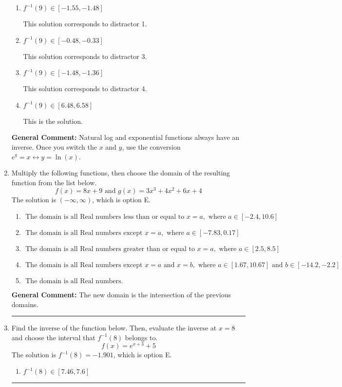 \documentclass{extbook}[14pt]
\newcommand{\litem}[1]{\item #1

\rule{\textwidth}{0.4pt}}
\begin{document}
\begin{enumerate}
{\begin{enumerate}[label=\Alph*.]
 This solution corresponds to distractor 2.
\item \( f^{-1}(9) \in [-1.55, -1.48] \)

 This solution corresponds to distractor 1.
\item \( f^{-1}(9) \in [-0.48, -0.33] \)

 This solution corresponds to distractor 3.
\item \( f^{-1}(9) \in [-1.48, -1.36] \)

 This solution corresponds to distractor 4.
\item \( f^{-1}(9) \in [6.48, 6.58] \)

 This is the solution.
\end{enumerate}

\textbf{General Comment:} Natural log and exponential functions always have an inverse. Once you switch the $x$ and $y$, use the conversion $ e^y = x \leftrightarrow y=\ln(x)$.
}
\litem{
Multiply the following functions, then choose the domain of the resulting function from the list below.
\[ f(x) = 8x + 9 \text{ and } g(x) = 3x^{3} +4 x^{2} +6 x + 4 \]The solution is \( (-\infty, \infty) \), which is option E.\begin{enumerate}[label=\Alph*.]
\item \( \text{ The domain is all Real numbers less than or equal to } x = a, \text{ where } a \in [-2.4, 10.6] \)


\item \( \text{ The domain is all Real numbers except } x = a, \text{ where } a \in [-7.83, 0.17] \)


\item \( \text{ The domain is all Real numbers greater than or equal to } x = a, \text{ where } a \in [2.5, 8.5] \)


\item \( \text{ The domain is all Real numbers except } x = a \text{ and } x = b, \text{ where } a \in [1.67, 10.67] \text{ and } b \in [-14.2, -2.2] \)


\item \( \text{ The domain is all Real numbers. } \)


\end{enumerate}

\textbf{General Comment:} The new domain is the intersection of the previous domains.
}
\litem{
Find the inverse of the function below. Then, evaluate the inverse at $x = 8$ and choose the interval that $f^{-1}(8)$ belongs to.
\[ f(x) = e^{x+3}+5 \]The solution is \( f^{-1}(8) = -1.901 \), which is option E.\begin{enumerate}[label=\Alph*.]
\item \( f^{-1}(8) \in [7.46, 7.6] \)


\end{enumerate}}
\end{enumerate}
\end{document}
